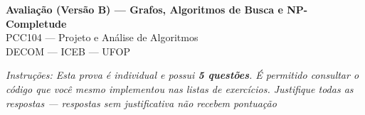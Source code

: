 \documentclass[10pt,a4paper]{extarticle}
\begin{document}
\begin{center}
    {\LARGE\bfseries Avaliação (Versão B) --- Grafos, Algoritmos de Busca e NP-Completude}\\[0.3cm]
    {\large PCC104 --- Projeto e Análise de Algoritmos}\\[0.15cm]
    {DECOM --- ICEB --- UFOP}\\[0.35cm]
\end{center}

\noindent

\small
\textit{Instruções: Esta prova é individual e possui \textbf{5 questões}. É permitido consultar o código que você mesmo implementou nas listas de exercícios. Justifique todas as respostas --- respostas sem justificativa não recebem pontuação}

\normalsize
\vspace{0.4cm}
\end{document}
